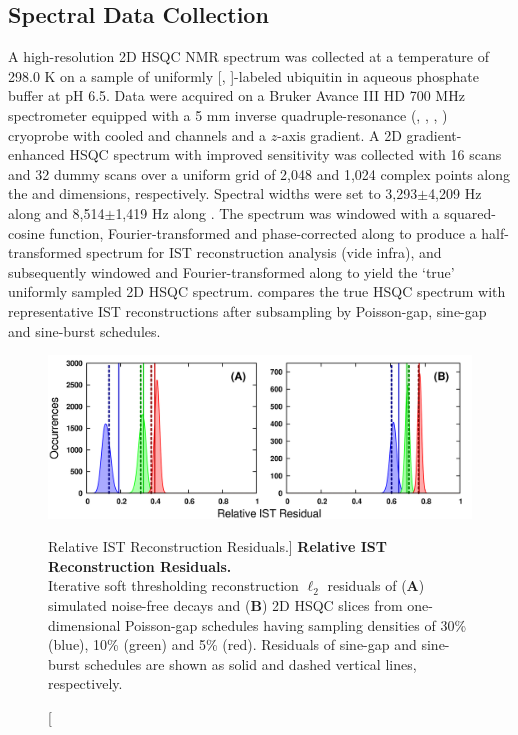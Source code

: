 \subsection{Spectral Data Collection}

\begin{doublespace}
A high-resolution 2D \hnnmr{} HSQC NMR spectrum was collected at a temperature
of 298.0 K on a sample of uniformly [\nnmr{}, \cnmr{}]-labeled ubiquitin in
aqueous phosphate buffer at pH 6.5. Data were acquired on a Bruker Avance
III HD 700 MHz spectrometer equipped with a 5 mm inverse quadruple-resonance
(\hnmr{}, \cnmr{}, \nnmr{}, \pnmr{}) cryoprobe with cooled \hnmr{} and \cnmr{}
channels and a $z$-axis gradient. A 2D gradient-enhanced \hnnmr{} HSQC spectrum
with improved sensitivity \cite{kay:jacs1992,palmer:jmr1991} was collected with
16 scans and 32 dummy scans over a uniform grid of 2,048 and 1,024 complex
points along the \hnmr{} and \nnmr{} dimensions, respectively. Spectral widths
were set to 3,293$\pm$4,209 Hz along \hnmr{} and 8,514$\pm$1,419 Hz along
\nnmr{}. The spectrum was windowed with a squared-cosine function,
Fourier-transformed and phase-corrected along \hnmr{} to produce a
half-transformed spectrum for IST reconstruction analysis (vide infra),
and subsequently windowed and Fourier-transformed along \nnmr{} to yield the
`true' uniformly sampled 2D \hnnmr{} HSQC spectrum. 
compares the true HSQC spectrum with representative IST reconstructions after
subsampling by Poisson-gap, sine-gap and sine-burst schedules.
\end{doublespace}

\begin{figure}[ht!]
\includegraphics[width=6.5in]{figs/dgs/07-residuals.png}
\caption
      [Relative IST Reconstruction Residuals.]{
  {\bf Relative IST Reconstruction Residuals.}
  \\
  Iterative soft thresholding reconstruction $\ell_2$ residuals of ({\bf A})
  simulated noise-free decays and ({\bf B}) 2D \hnnmr{} HSQC slices from
  one-dimensional Poisson-gap schedules having sampling densities of
  30\% (blue), 10\% (green) and 5\% (red). Residuals of sine-gap and sine-burst
  schedules are shown as solid and dashed vertical lines, respectively.
}
\label{figure.2.7}
\end{figure}

